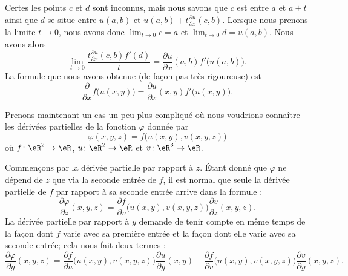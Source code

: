 Certes les points \( c\) et \( d\) sont inconnus, mais nous savons que \( c\) est entre \( a\) et \( a+t\) ainsi que \( d\) se situe entre \( u(a,b)\) et \( u(a,b)+t\frac{ \partial u }{ \partial x }(c,b)\). Lorsque nous prenons la limite \( t\to 0\), nous avons donc \( \lim_{t\to 0} c=a\) et \( \lim_{t\to 0} d=u(a,b)\). Nous avons alors
\begin{equation}
	\lim_{t\to 0} \frac{ t\frac{ \partial u }{ \partial x }(c,b)f'(d) }{ t }=\frac{ \partial u }{ \partial x }(a,b)f'\big( u(a,b) \big).
\end{equation}
La formule que nous avons obtenue (de façon pas très rigoureuse) est
\begin{equation}
	\frac{ \partial  }{ \partial x }f\big( u(x,y) \big)=\frac{ \partial u }{ \partial x }(x,y)f'\big( u(x,y) \big).
\end{equation}

Prenons maintenant un cas un peu plus compliqué où nous voudrions connaître les dérivées partielles de la fonction \( \varphi\) donnée par
\begin{equation}
	\varphi(x,y,z)=f\big( u(x,y),v(x,y,z) \big)
\end{equation}
où \( f\colon \eR^2\to \eR\), \( u\colon \eR^2\to \eR\) et \( v\colon \eR^3\to \eR\).

Commençons par la dérivée partielle par rapport à \( z\). Étant donné que \( \varphi\) ne dépend de \( z\) que via la seconde entrée de \( f\), il est normal que seule la dérivée partielle de \( f\) par rapport à sa seconde entrée arrive dans la formule :
\begin{equation}
	\frac{ \partial \varphi }{ \partial z }(x,y,z)=\frac{ \partial f }{ \partial v }\big( u(x,y),v(x,y,z) \big)\frac{ \partial v }{ \partial z }(x,y,z).
\end{equation}
La dérivée partielle par rapport à \( y\) demande de tenir compte en même temps de la façon dont \( f\) varie avec sa première entrée et la façon dont elle varie avec sa seconde entrée; cela nous fait deux termes :
\begin{equation}
	\frac{ \partial \varphi }{ \partial y }(x,y,z)=\frac{ \partial f }{ \partial u }\big( u(x,y),v(x,y,z) \big)\frac{ \partial u }{ \partial y }(x,y)+\frac{ \partial f }{ \partial v }\big( u(x,y),v(x,y,z) \big)\frac{ \partial v }{ \partial y }(x,y,z).
\end{equation}


